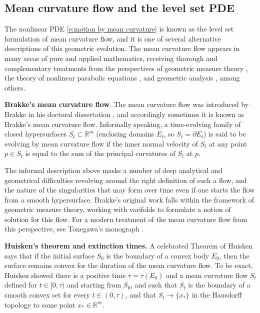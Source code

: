 \documentclass[reqno]{amsart}
\numberwithin{equation}{section}
\begin{document}
\subsection{Mean curvature flow and the level set PDE}\label{s:level set PDE} The nonlinear PDE \eqref{e:motion by mean curvature} is known as the level set formulation of mean curvature flow, and it is one of several alternative descriptions of this geometric evolution. The mean curvature flow appears in many areas of pure and applied mathematics, receiving thorough and complementary treatments from the perspectives of geometric measure theory \cite{brakke1978motion,tonegawa2019brakke}, the theory of nonlinear parabolic equations \cite{EvansSpruck1991,ChenGigaGoto1989,GigaGotoIshiiSato1991}, and geometric analysis \cite{colding2015mean}, among others. 

\textbf{Brakke's mean curvature flow}. The mean curvature flow was introduced by Brakke in his doctoral dissertation \cite{brakke1978motion}, and accordingly sometimes it is known as Brakke's mean curvature flow. Informally speaking, a time-evolving family of closed hypersurfaces $S_t \subset \mathbb{R}^m$ (enclosing domains $E_t$, so $S_t = \partial E_t$) is said to be evolving by mean curvature flow if the inner normal velocity of $S_t$ at any point $p\in S_t$ is equal to the sum of the principal curvatures of $S_t$ at $p$. 

The informal description above masks a number of deep analytical and geometrical difficulties revolving around the right definition of such a flow, and the nature of the singularities that may form over time even if one starts the flow from a smooth hypersurface. Brakke's original work \cite{brakke1978motion} falls within the framework of geometric measure theory, working with varifolds to formulate a notion of solution for this flow. For a modern treatment of the mean curvature flow from this perspective, see Tonegawa's monograph \cite{tonegawa2019brakke}.
 
\textbf{Huisken's theorem and extinction times.} A celebrated Theorem of Huisken \cite{Huisken1984} says that if the initial surface $S_0$ is the boundary of a convex body $E_0$, then the surface remains convex for the duration of the mean curvature flow. To be exact, Huisken showed there is a positive time $\tau = \tau(E_0)$ and a mean curvature flow $S_t$ defined for $t\in [0,\tau)$ and starting from $S_0$, and such that $S_t$ is the boundary of a smooth convex set for every $t\in (0,\tau)$, and that $S_t\to \{x_*\}$ in the Hausdorff topology to some point $x_* \in \mathbb{R}^m$. 
\end{document}
